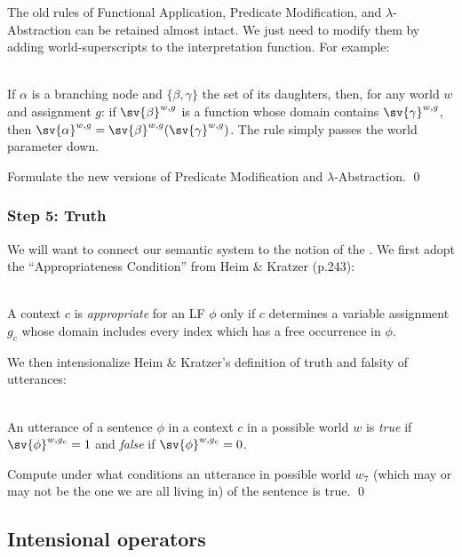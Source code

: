 The old rules of Functional Application, Predicate Modification, and
$\lambda$-Abstraction can be retained almost intact. We just need to modify them
by adding world-superscripts to the interpretation function. For example:

\ex {}\\
If $\alpha$ is a branching node and $\{\beta, \gamma\}$ the set of its
daughters, then, for any world $w$ and assignment $g$: if
$\sv{\beta}^{w,g}$ is a function whose domain contains
$\sv{\gamma}^{w,g}$, then
$\sv{\alpha}^{w,g} = \sv{\beta}^{w,g} (\sv{\gamma}^{w,g})$.
\xe
%
The rule simply passes the world parameter down.

\begin{exercise}
  Formulate the new versions of Predicate Modification and
  \(\lambda\)-Abstraction. \qed
\end{exercise}

\subsubsection{Step 5: Truth} \label{sec:truth}

We will want to connect our semantic system to the notion of the . We first adopt the ``Appropriateness Condition'' from Heim \&
Kratzer (p.243):

\ex {}\\
A context $c$ is \emph{appropriate} for an LF $\phi$ only if $c$
determines a variable assignment $g_c$ whose domain includes every
index which has a free occurrence in $\phi$. \xe

\kwn
We then intensionalize Heim \& Kratzer's definition of truth and falsity of
utterances:

\ex {}\\
An utterance of a sentence $\phi$ in a context $c$ in a possible world $w$ is
\emph{true} if $\sv{\phi}^{w,g_c} = 1$ and \emph{false} if $\sv{\phi}^{w,g_c} =
0$.
\xe

\begin{exercise}
  Compute under what conditions an utterance in possible world $w_7$ (which may
  or may not be the one we are all living in) of the sentence  is true. \qed
\end{exercise}

\subsection{Intensional operators} \label{sec:intens-oper}

